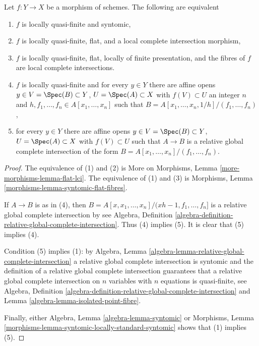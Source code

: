 \begin{lemma}
\label{lemma-syntomic-quasi-finite}
Let $f : Y \to X$ be a morphism of schemes. The following are equivalent
\begin{enumerate}
\item $f$ is locally quasi-finite and syntomic,
\item $f$ is locally quasi-finite, flat, and a local complete intersection
morphism,
\item $f$ is locally quasi-finite, flat, locally of finite presentation,
and the fibres of $f$ are local complete intersections.
\item $f$ is locally quasi-finite and for every $y \in Y$ there are
affine opens $y \in V = \Spec(B) \subset Y$, $U = \Spec(A) \subset X$
with $f(V) \subset U$ an integer $n$ and
$h, f_1, \ldots, f_n \in A[x_1, \ldots, x_n]$ such that
$B = A[x_1, \ldots, x_n, 1/h]/(f_1, \ldots, f_n)$,
\item for every $y \in Y$ there are affine opens
$y \in V = \Spec(B) \subset Y$, $U = \Spec(A) \subset X$
with $f(V) \subset U$ such that $A \to B$ is a relative global complete
intersection of the form $B = A[x_1, \ldots, x_n]/(f_1, \ldots, f_n)$.
\end{enumerate}
\end{lemma}

\begin{proof}
The equivalence of (1) and (2) is
More on Morphisms, Lemma \ref{more-morphisms-lemma-flat-lci}.
The equivalence of (1) and (3) is 
Morphisms, Lemma \ref{morphisms-lemma-syntomic-flat-fibres}.

\medskip\noindent
If $A \to B$ is as in (4), then
$B = A[x, x_1, \ldots, x_n]/(xh - 1, f_1, \ldots, f_n]$
is a relative global complete intersection by see Algebra, Definition
\ref{algebra-definition-relative-global-complete-intersection}.
Thus (4) implies (5).
It is clear that (5) implies (4).

\medskip\noindent
Condition (5) implies (1): by
Algebra, Lemma \ref{algebra-lemma-relative-global-complete-intersection}
a relative global complete intersection is syntomic and
the definition of a relative global complete intersection
guarantees that a relative global complete intersection on
$n$ variables with $n$ equations is quasi-finite, see
Algebra, Definition
\ref{algebra-definition-relative-global-complete-intersection} and
Lemma \ref{algebra-lemma-isolated-point-fibre}.

\medskip\noindent
Finally, either Algebra, Lemma \ref{algebra-lemma-syntomic} or
Morphisms, Lemma \ref{morphisms-lemma-syntomic-locally-standard-syntomic}
shows that (1) implies (5).
\end{proof}

